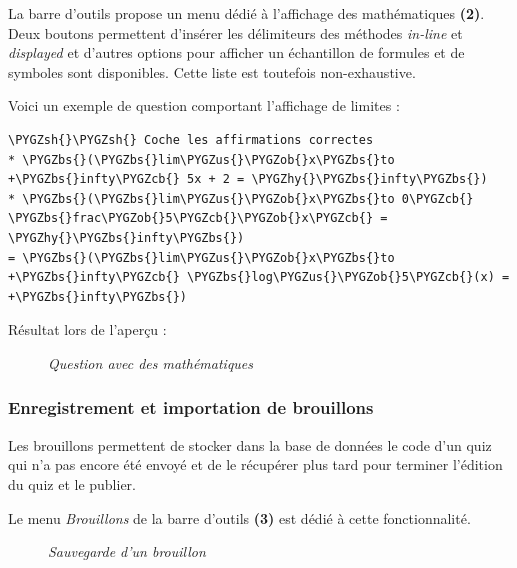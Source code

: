 \documentclass[a4paper,11pt,openany,oneside]{sphinxmanual}
\def\PYGZbs{\char`\\}
\def\PYGZus{\char`\_}
\def\PYGZob{\char`\{}
\def\PYGZcb{\char`\}}
\def\PYGZsh{\char`\#}
\def\PYGZhy{\char`\-}
\begin{document}
La barre d'outils propose un menu dédié à l'affichage des mathématiques \textbf{(2)}. Deux boutons permettent d'insérer les délimiteurs des méthodes \emph{in-line} et \emph{displayed} et d'autres options pour afficher un échantillon de formules et de symboles sont disponibles. Cette liste est toutefois non-exhaustive.

Voici un exemple de question comportant l'affichage de limites :

\begin{Verbatim}[commandchars=\\\{\}]
\PYGZsh{}\PYGZsh{} Coche les affirmations correctes
* \PYGZbs{}(\PYGZbs{}lim\PYGZus{}\PYGZob{}x\PYGZbs{}to +\PYGZbs{}infty\PYGZcb{} 5x + 2 = \PYGZhy{}\PYGZbs{}infty\PYGZbs{})
* \PYGZbs{}(\PYGZbs{}lim\PYGZus{}\PYGZob{}x\PYGZbs{}to 0\PYGZcb{} \PYGZbs{}frac\PYGZob{}5\PYGZcb{}\PYGZob{}x\PYGZcb{} = \PYGZhy{}\PYGZbs{}infty\PYGZbs{})
= \PYGZbs{}(\PYGZbs{}lim\PYGZus{}\PYGZob{}x\PYGZbs{}to +\PYGZbs{}infty\PYGZcb{} \PYGZbs{}log\PYGZus{}\PYGZob{}5\PYGZcb{}(x) = +\PYGZbs{}infty\PYGZbs{})
\end{Verbatim}

Résultat lors de l'aperçu :
\begin{figure}[htbp]
\centering
\capstart

\caption{\emph{Question avec des mathématiques}}\end{figure}


\subsubsection{Enregistrement et importation de brouillons}
\label{doc-user:enregistrement-et-importation-de-brouillons}
Les brouillons permettent de stocker dans la base de données le code d'un quiz qui n'a pas encore été envoyé et de le récupérer plus tard pour terminer l'édition du quiz et le publier.

Le menu \emph{Brouillons} de la barre d'outils \textbf{(3)} est dédié à cette fonctionnalité.
\begin{figure}[htbp]
\centering
\capstart

\caption{\emph{Sauvegarde d'un brouillon}}\end{figure}
\end{document}
